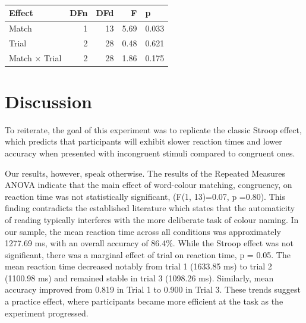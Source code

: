 \documentclass[
  authoryear,
  preprint]{elsarticle}
\begin{document}
\begin{longtable}[]{@{}lrrrl@{}}

\caption{\label{tbl-setup2}}

\tabularnewline

\toprule\noalign{}
Effect & DFn & DFd & F & p \\
\midrule\noalign{}
\endhead
\bottomrule\noalign{}
\endlastfoot
Match & 1 & 13 & 5.69 & 0.033 \\
Trial & 2 & 28 & 0.48 & 0.621 \\
Match × Trial & 2 & 28 & 1.86 & 0.175 \\

\end{longtable}

\section{Discussion}\label{discussion}

To reiterate, the goal of this experiment was to replicate the classic
Stroop effect, which predicts that participants will exhibit slower
reaction times and lower accuracy when presented with incongruent
stimuli compared to congruent ones.~

Our results, however, speak otherwise. The results of the Repeated
Measures ANOVA indicate that the main effect of word-colour matching,
congruency, on reaction time was not statistically significant, (F(1,
13)=0.07, p =0.80). This finding contradicts the established literature
which states that the automaticity of reading typically interferes with
the more deliberate task of colour naming. In our sample, the mean
reaction time across all conditions was approximately 1277.69 ms, with
an overall accuracy of 86.4\%. While the Stroop effect was not
significant, there was a marginal effect of trial on reaction time, p =
0.05. The mean reaction time decreased notably from trial 1 (1633.85 ms)
to trial 2 (1100.98 ms) and remained stable in trial 3 (1098.26 ms).
Similarly, mean accuracy improved from 0.819 in Trial 1 to 0.900 in
Trial 3. These trends suggest a practice effect, where participants
became more efficient at the task as the experiment progressed.
\end{document}
